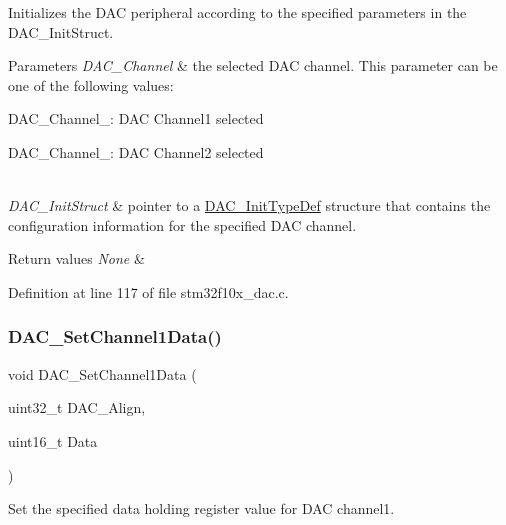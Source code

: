 Initializes the D\+AC peripheral according to the specified parameters in the D\+A\+C\+\_\+\+Init\+Struct. 


\begin{DoxyParams}{Parameters}
{\em D\+A\+C\+\_\+\+Channel} & the selected D\+AC channel. This parameter can be one of the following values\+: \begin{DoxyItemize}
\item D\+A\+C\+\_\+\+Channel\+\_\+: D\+AC Channel1 selected \item D\+A\+C\+\_\+\+Channel\+\_\+: D\+AC Channel2 selected \end{DoxyItemize}
\\
\hline
{\em D\+A\+C\+\_\+\+Init\+Struct} & pointer to a \hyperlink{struct_d_a_c___init_type_def}{D\+A\+C\+\_\+\+Init\+Type\+Def} structure that contains the configuration information for the specified D\+AC channel. \\
\hline
\end{DoxyParams}

\begin{DoxyRetVals}{Return values}
{\em None} & \\
\hline
\end{DoxyRetVals}


Definition at line 117 of file stm32f10x\+\_\+dac.\+c.

\mbox{\label{group___d_a_c___private___functions_gad06b4230d2b17d1d13f41dce4c782461}} 
\subsubsection{\texorpdfstring{D\+A\+C\+\_\+\+Set\+Channel1\+Data()}{DAC\_SetChannel1Data()}}
{\footnotesize\ttfamily void D\+A\+C\+\_\+\+Set\+Channel1\+Data (\begin{DoxyParamCaption}\item[{uint32\+\_\+t}]{D\+A\+C\+\_\+\+Align,  }\item[{uint16\+\_\+t}]{Data }\end{DoxyParamCaption})}



Set the specified data holding register value for D\+AC channel1. 


